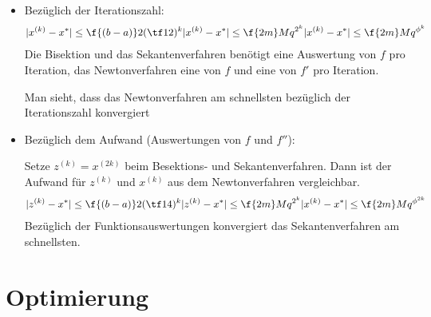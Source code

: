 \documentclass[11pt]{scrartcl}
\begin{document}
\begin{nt*}
	\begin{itemize}
		\item
			Bezüglich der Iterationszahl:
			\begin{align*}
				|x^{(k)} -x^*| \le \f {(b-a)}2 (\tf 12)^k
				|x^{(k)} -x^*| \le \f {2m}M q^{2^k}
				|x^{(k)} -x^*| \le \f {2m}M q^{\phi^k}
			\end{align*}
			Die Bisektion und das Sekantenverfahren benötigt eine Auswertung von $f$ pro Iteration, das Newtonverfahren eine von $f$ und eine von $f'$ pro Iteration.

			Man sieht, dass das Newtonverfahren am schnellsten bezüglich der Iterationszahl konvergiert
		\item
			Bezüglich dem Aufwand (Auswertungen von $f$ und $f''$):

			Setze $z^{(k)} = x^{(2k)}$ beim Besektions- und Sekantenverfahren.
			Dann ist der Aufwand für $z^{(k)}$ und $x^{(k)}$ aus dem Newtonverfahren vergleichbar.
			\begin{align*}
				|z^{(k)} -x^*| \le \f {(b-a)}2 (\tf 14)^k
				|z^{(k)} -x^*| \le \f {2m}M q^{2^k}
				|x^{(k)} -x^*| \le \f {2m}M q^{\phi^{2k}}
			\end{align*}
			Bezüglich der Funktionsauswertungen konvergiert das Sekantenverfahren am schnellsten.


	\end{itemize}
\end{nt*}



\section{Optimierung}
\end{document}
